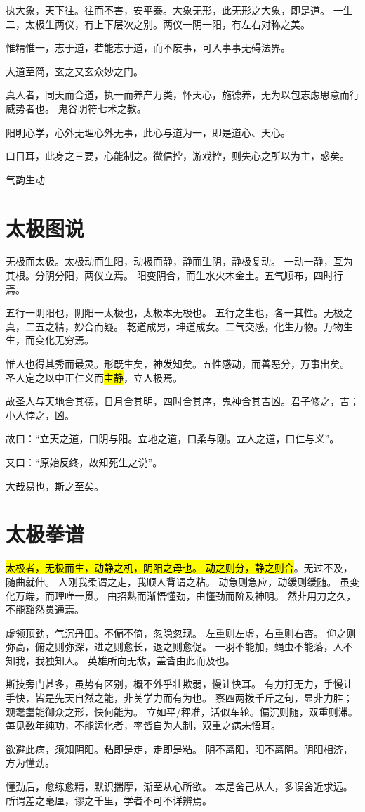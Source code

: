 执大象，天下往。往而不害，安平泰。大象无形，此无形之大象，即是道。
一生二，太极生两仪，有上下层次之别。两仪一阴一阳，有左右对称之美。

惟精惟一，志于道，若能志于道，而不废事，可入事事无碍法界。

大道至简，玄之又玄众妙之门。

真人者，同天而合道，执一而养产万类，怀天心，施德养，无为以包志虑思意而行威势者也。
鬼谷阴符七术之教。

阳明心学，心外无理心外无事，此心与道为一，即是道心、天心。

口目耳，此身之三要，心能制之。微信控，游戏控，则失心之所以为主，惑矣。

气韵生动

\section{太极图说}

无极而太极。太极动而生阳，动极而静，静而生阴，静极复动。
一动一静，互为其根。分阴分阳，两仪立焉。
阳变阴合，而生水火木金土。五气顺布，四时行焉。

五行一阴阳也，阴阳一太极也，太极本无极也。
五行之生也，各一其性。无极之真，二五之精，妙合而疑。
乾道成男，坤道成女。二气交感，化生万物。万物生生，而变化无穷焉。

惟人也得其秀而最灵。形既生矣，神发知矣。五性感动，而善恶分，万事出矣。
圣人定之以中正仁义而\hl{主静}，立人极焉。

故圣人与天地合其德，日月合其明，四时合其序，鬼神合其吉凶。君子修之，吉；小人悖之，凶。

故曰：“立天之道，曰阴与阳。立地之道，曰柔与刚。立人之道，曰仁与义”。

又曰：“原始反终，故知死生之说”。

大哉易也，斯之至矣。

\section{太极拳谱}

\hl{太极者，无极而生，动静之机，阴阳之母也。
动之则分，静之则合}。无过不及，随曲就伸。
人刚我柔谓之走，我顺人背谓之粘。
动急则急应，动缓则缓随。
虽变化万端，而理唯一贯。
由招熟而渐悟懂劲，由懂劲而阶及神明。
然非用力之久，不能豁然贯通焉。

虚领顶劲，气沉丹田。不偏不倚，忽隐忽现。
左重则左虚，右重则右杳。
仰之则弥高，俯之则弥深，进之则愈长，退之则愈促。
一羽不能加，蝇虫不能落，人不知我，我独知人。
英雄所向无敌，盖皆由此而及也。

斯技旁门甚多，虽势有区别，概不外乎壮欺弱，慢让快耳。
有力打无力，手慢让手快，皆是先天自然之能，非关学力而有为也。
察四两拨千斤之句，显非力胜；观耄耋能御众之形，快何能为。
立如平/秤准，活似车轮。偏沉则随，双重则滞。
每见数年纯功，不能运化者，率皆自为人制，双重之病未悟耳。

欲避此病，须知阴阳。粘即是走，走即是粘。
阴不离阳，阳不离阴。阴阳相济，方为懂劲。

懂劲后，愈练愈精，默识揣摩，渐至从心所欲。
本是舍己从人，多误舍近求远。
所谓差之毫厘，谬之千里，学者不可不详辨焉。
